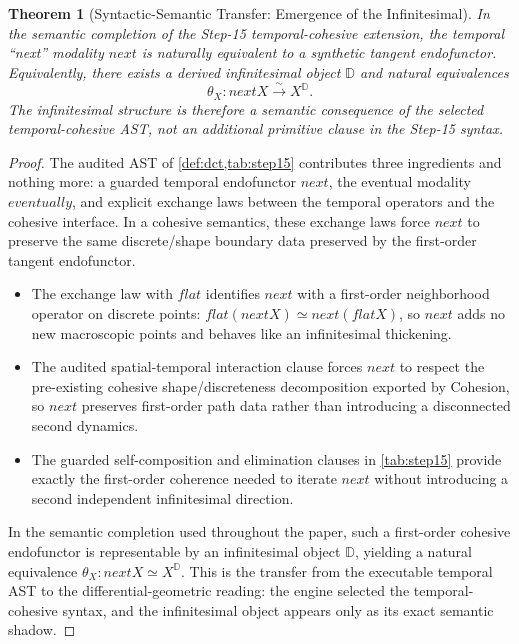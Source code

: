 \documentclass[11pt,a4paper]{article}
\def\flat{flat}%
\def\bigcirc{next}%
\def\Diamond{eventually}%
\theoremstyle{plain}
\newtheorem{theorem}{Theorem}[section]
\theoremstyle{definition}
\theoremstyle{remark}
\newcommand{\D}{\mathbb{D}}
\begin{document}
\begin{theorem}[Syntactic-Semantic Transfer: Emergence of the Infinitesimal]
\label{lem:infinitesimal-temporal}
In the semantic completion of the Step-15 temporal-cohesive extension, the temporal ``next'' modality $\bigcirc$ is naturally equivalent to a synthetic tangent endofunctor. Equivalently, there exists a derived infinitesimal object $\D$ and natural equivalences
\[
  \theta_X : \bigcirc X \overset{\sim}{\longrightarrow} X^\D .
\]
The infinitesimal structure is therefore a semantic consequence of the selected temporal-cohesive AST, not an additional primitive clause in the Step-15 syntax.
\end{theorem}
\begin{proof}
The audited AST of \cref{def:dct,tab:step15} contributes three ingredients and nothing more: a guarded temporal endofunctor $\bigcirc$, the eventual modality $\Diamond$, and explicit exchange laws between the temporal operators and the cohesive interface.  In a cohesive semantics, these exchange laws force $\bigcirc$ to preserve the same discrete/shape boundary data preserved by the first-order tangent endofunctor.
\begin{itemize}[nosep]
    \item The exchange law with $\flat$ identifies $\bigcirc$ with a first-order neighborhood operator on discrete points: $\flat(\bigcirc X) \simeq \bigcirc(\flat X)$, so $\bigcirc$ adds no new macroscopic points and behaves like an infinitesimal thickening.
    \item The audited spatial-temporal interaction clause forces $\bigcirc$ to respect the pre-existing cohesive shape/discreteness decomposition exported by Cohesion, so $\bigcirc$ preserves first-order path data rather than introducing a disconnected second dynamics.
    \item The guarded self-composition and elimination clauses in \cref{tab:step15} provide exactly the first-order coherence needed to iterate $\bigcirc$ without introducing a second independent infinitesimal direction.
\end{itemize}
\noindent In the semantic completion used throughout the paper, such a first-order cohesive endofunctor is representable by an infinitesimal object $\D$, yielding a natural equivalence $\theta_X : \bigcirc X \simeq X^\D$.  This is the transfer from the executable temporal AST to the differential-geometric reading: the engine selected the temporal-cohesive syntax, and the infinitesimal object appears only as its exact semantic shadow.
\end{proof}
\end{document}
